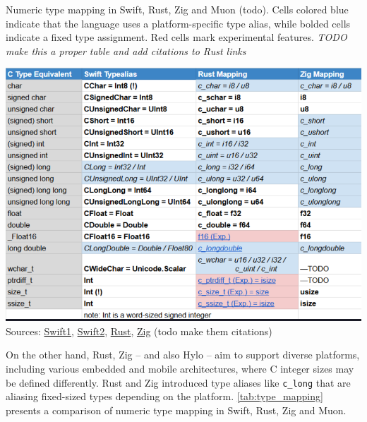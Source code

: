 \begin{table}
    \centering
    \caption{Numeric type mapping in Swift, Rust, Zig and Muon (todo). Cells colored blue indicate that the language uses a platform-specific type alias, while bolded cells indicate a fixed type assignment. Red cells mark experimental features.\textit{ TODO make this a proper table and add citations to Rust links}}
    \includegraphics[width=\textwidth]{attachments/type comparison.png}
    \vspace{1em} %
    \footnotesize {
        Sources:
        \href{https://github.com/swiftlang/swift/blob/main/docs/HowSwiftImportsCAPIs.md#fundamental-types}{Swift1}, 
        \href{https://github.com/swiftlang/swift/blob/main/include/swift/ClangImporter/BuiltinMappedTypes.def}{Swift2}, 
        \href{https://github.com/rust-lang/rust/blob/master/library/core/src/ffi/primitives.rs}{Rust}, 
        \href{https://ziglang.org/documentation/0.14.1/#toc-Primitive-Types}{Zig} (todo make them citations)
    }

    \label{tab:type_mapping}    
\end{table}




On the other hand, Rust, Zig -- and also Hylo -- aim to support diverse platforms, including various embedded and mobile architectures, where C integer sizes may be defined differently. Rust and Zig introduced type aliases like \texttt{c\_long} that are aliasing fixed-sized types depending on the platform. \autoref{tab:type_mapping} presents a comparison of numeric type mapping in Swift, Rust, Zig and Muon. 



